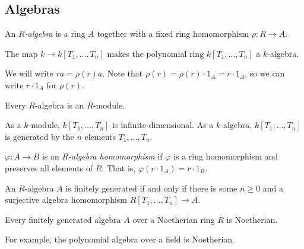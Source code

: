 \subsection{Algebras}
\begin{definition}
    An \emph{\( R \)-algebra} is a ring \( A \) together with a fixed ring homomorphism \( \rho : R \to A \).
\end{definition}
\begin{example}
    The map \( k \to k[T_1, \dots, T_n] \) makes the polynomial ring \( k[T_1, \dots, T_n] \) a \( k \)-algebra.
\end{example}
We will write \( ra = \rho(r) a \).
Note that \( \rho(r) = \rho(r) \cdot 1_A = r \cdot 1_A \), so we can write \( r \cdot 1_A \) for \( \rho(r) \).
\begin{remark}
    Every \( R \)-algebra is an \( R \)-module.
\end{remark}
\begin{example}
    As a \( k \)-module, \( k[T_1, \dots, T_n] \) is infinite-dimensional.
    As a \( k \)-algebra, \( k[T_1, \dots, T_n] \) is generated by the \( n \) elements \( T_1, \dots, T_n \).
\end{example}
\begin{definition}
    \( \varphi : A \to B \) is an \emph{\( R \)-algebra homomorphism} if \( \varphi \) is a ring homomorphism and preserves all elements of \( R \).
    That is, \( \varphi(r \cdot 1_A) = r \cdot 1_B \).
\end{definition}
An \( R \)-algebra \( A \) is finitely generated if and only if there is some \( n \geq 0 \) and a surjective algebra homomorphism \( R[T_1, \dots, T_n] \to A \).
\begin{theorem}
    Every finitely generated algebra \( A \) over a Noetherian ring \( R \) is Noetherian.
\end{theorem}
For example, the polynomial algebra over a field is Noetherian.
